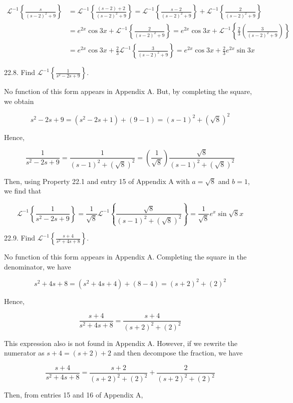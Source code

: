 \documentclass[10pt]{article}
\begin{document}
$$
\begin{aligned}
\mathscr{L}^{-1}\left\{\frac{s}{(s-2)^{2}+9}\right\} & =\mathscr{L}^{-1}\left\{\frac{(s-2)+2}{(s-2)^{2}+9}\right\}=\mathscr{L}^{-1}\left\{\frac{s-2}{(s-2)^{2}+9}\right\}+\mathscr{L}^{-1}\left\{\frac{2}{(s-2)^{2}+9}\right\} \\
& =e^{2 x} \cos 3 x+\mathscr{L}^{-1}\left\{\frac{2}{(s-2)^{2}+9}\right\}=e^{2 x} \cos 3 x+\mathscr{L}^{-1}\left\{\frac{2}{3}\left(\frac{3}{(s-2)^{2}+9}\right)\right\} \\
& =e^{2 x} \cos 3 x+\frac{2}{3} \mathscr{L}^{-1}\left\{\frac{3}{(s-2)^{2}+9}\right\}=e^{2 x} \cos 3 x+\frac{2}{3} e^{2 x} \sin 3 x
\end{aligned}
$$

22.8. Find $\mathscr{L}^{-1}\left\{\frac{1}{s^{2}-2 s+9}\right\}$.

No function of this form appears in Appendix A. But, by completing the square, we obtain

$$
s^{2}-2 s+9=\left(s^{2}-2 s+1\right)+(9-1)=(s-1)^{2}+(\sqrt{8})^{2}
$$

Hence,

$$
\frac{1}{s^{2}-2 s+9}=\frac{1}{(s-1)^{2}+(\sqrt{8})^{2}}=\left(\frac{1}{\sqrt{8}}\right) \frac{\sqrt{8}}{(s-1)^{2}+(\sqrt{8})^{2}}
$$

Then, using Property 22.1 and entry 15 of Appendix A with $a=\sqrt{8}$ and $b=1$, we find that

$$
\mathscr{L}^{-1}\left\{\frac{1}{s^{2}-2 s+9}\right\}=\frac{1}{\sqrt{8}} \mathscr{L}^{-1}\left\{\frac{\sqrt{8}}{(s-1)^{2}+(\sqrt{8})^{2}}\right\}=\frac{1}{\sqrt{8}} e^{x} \sin \sqrt{8} x
$$

22.9. Find $\mathscr{L}^{-1}\left\{\frac{s+4}{s^{2}+4 s+8}\right\}$.

No function of this form appears in Appendix A. Completing the square in the denominator, we have

$$
s^{2}+4 s+8=\left(s^{2}+4 s+4\right)+(8-4)=(s+2)^{2}+(2)^{2}
$$

Hence,

$$
\frac{s+4}{s^{2}+4 s+8}=\frac{s+4}{(s+2)^{2}+(2)^{2}}
$$

This expression also is not found in Appendix A. However, if we rewrite the numerator as $s+4=(s+2)+2$ and then decompose the fraction, we have

$$
\frac{s+4}{s^{2}+4 s+8}=\frac{s+2}{(s+2)^{2}+(2)^{2}}+\frac{2}{(s+2)^{2}+(2)^{2}}
$$

Then, from entries 15 and 16 of Appendix A,
\end{document}
